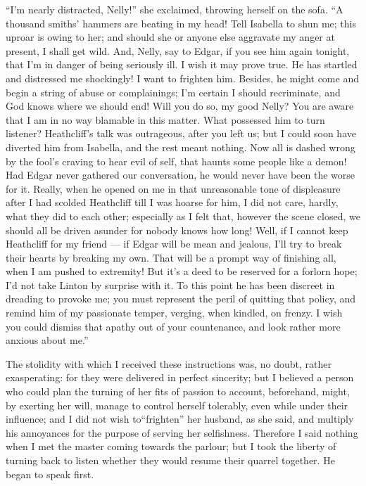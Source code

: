 \par “I'm nearly distracted, Nelly!” she exclaimed, throwing herself on the sofa. “A thousand smiths' hammers are beating in my head! Tell Isabella to shun me; this uproar is owing to her; and should she or anyone else aggravate my anger at present, I shall get wild. And, Nelly, say to Edgar, if you see him again tonight, that I'm in danger of being seriously ill. I wish it may prove true. He has startled and distressed me shockingly! I want to frighten him. Besides, he might come and begin a string of abuse or complainings; I'm certain I should recriminate, and God knows where we should end! Will you do so, my good Nelly? You are aware that I am in no way blamable in this matter. What possessed him to turn listener? Heathcliff's talk was outrageous, after you left us; but I could soon have diverted him from Isabella, and the rest meant nothing. Now all is dashed wrong by the fool's craving to hear evil of self, that haunts some people like a demon! Had Edgar never gathered our conversation, he would never have been the worse for it. Really, when he opened on me in that unreasonable tone of displeasure after I had scolded Heathcliff till I was hoarse for him, I did not care, hardly, what they did to each other; especially as I felt that, however the scene closed, we should all be driven asunder for nobody knows how long! Well, if I cannot keep Heathcliff for my friend — if Edgar will be mean and jealous, I'll try to break their hearts by breaking my own. That will be a prompt way of finishing all, when I am pushed to extremity! But it's a deed to be reserved for a forlorn hope; I'd not take Linton by surprise with it. To this point he has been discreet in dreading to provoke me; you must represent the peril of quitting that policy, and remind him of my passionate temper, verging, when kindled, on frenzy. I wish you could dismiss that apathy out of your countenance, and look rather more anxious about me.”
\par The stolidity with which I received these instructions was, no doubt, rather exasperating: for they were delivered in perfect sincerity; but I believed a person who could plan the turning of her fits of passion to account, beforehand, might, by exerting her will, manage to control herself tolerably, even while under their influence; and I did not wish to“frighten” her husband, as she said, and multiply his annoyances for the purpose of serving her selfishness. Therefore I said nothing when I met the master coming towards the parlour; but I took the liberty of turning back to listen whether they would resume their quarrel together. He began to speak first.
